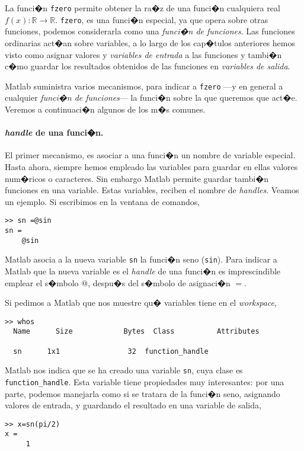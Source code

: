 La funci�n \texttt{fzero} permite obtener la ra�z de una funci�n cualquiera real $f(x):\mathbb{R} \rightarrow \mathbb{R}$. \texttt{fzero}, es una funci�n especial, ya que opera sobre otras funciones, podemos considerarla como una \emph{funci�n de funciones}. Las funciones ordinarias act�an sobre variables, a lo largo de los cap�tulos anteriores hemos visto como asignar valores y \emph{variables de entrada} a las funciones y tambi�n c�mo guardar los resultados obtenidos de las funciones en \emph{variables de salida}.

Matlab suministra varios mecanismos, para indicar a \texttt{fzero} ---y en general a cualquier \emph{funci�n de funciones}--- la funci�n sobre la que queremos que act�e. Veremos a continuaci�n algunos de los m�s comunes.

\paragraph{\emph{handle} de una funci�n.} El primer mecanismo, es asociar a una funci�n un nombre de variable especial. Hasta ahora, siempre hemos empleado las variables para guardar en ellas valores num�ricos o caracteres. Sin embargo Matlab permite guardar tambi�n funciones en una variable. Estas variables, reciben el nombre de \emph{handles}. Veamos un ejemplo. Si escribimos en la ventana de comandos, 

\begin{verbatim}
>> sn =@sin
sn = 
    @sin
\end{verbatim}

Matlab asocia a la nueva variable \texttt{sn} la funci�n seno (\texttt{sin}). Para indicar a Matlab que la nueva variable es el \emph{handle} de una funci�n es imprescindible emplear el s�mbolo @, despu�s del s�mbolo de asignaci�n $=$.

Si pedimos a Matlab que nos muestre qu� variables tiene en el \emph{workspace},

\begin{verbatim}
>> whos
  Name      Size            Bytes  Class          Attributes

  sn      1x1                32  function_handle              

\end{verbatim}

Matlab nos indica que se ha creado una variable \texttt{sn}, cuya clase es \texttt{function\_handle}. Esta variable tiene propiedades muy interesantes: por una parte, podemos manejarla como si se tratara de la funci�n seno, asignando valores de entrada, y guardando el resultado en una variable de salida, 
\begin{verbatim}
>> x=sn(pi/2)
x =
     1
\end{verbatim}

